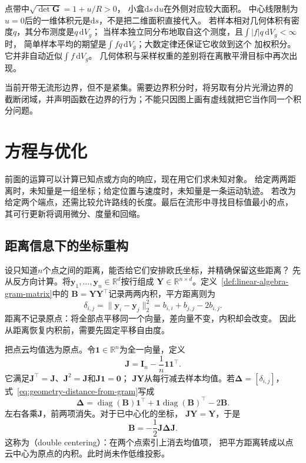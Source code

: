 点带中$\sqrt{\det\bm G}=1+u/R>0$，
小盒$\mathrm ds\,\mathrm du$在外侧对应较大面积。
中心线限制为$u=0$后的一维体积元是$\mathrm ds$，不是把二维面积直接代入。
若样本相对几何体积有密度$q$，其分布测度是$q\,\mathrm dV_g$；
当样本独立同分布地取自这个测度，且$\int|f|q\,\mathrm dV_g<\infty$时，
简单样本平均的期望是$\int fq\,\mathrm dV_g$；大数定律还保证它收敛到这个
加权积分。它并非自动近似$\int f\,\mathrm dV_g$。
几何体积与采样权重的差别将在离散平滑目标中再次出现。

当前开带无流形边界，但不是紧集。需要边界积分时，将另取有分片光滑边界的
截断闭域，并声明函数在边界的行为；不能只因图上画有虚线就把它当作同一个积分问题。

\section{方程与优化}
\label{sec:geometry-equations-optimization}

前面的运算可以计算已知点或方向的响应，现在用它们求未知对象。
给定两两距离时，未知量是一组坐标；给定位置与速度时，未知量是一条运动轨迹。
若改为给定两个端点，还需比较允许路线的长度。最后在流形中寻找目标值最小的点，
其可行更新将调用微分、度量和回缩。

\subsection{距离信息下的坐标重构}
\label{sec:geometry-distance-coordinate-embedding}

设只知道$n$个点之间的距离，能否给它们安排欧氏坐标，并精确保留这些距离？
先从反方向计算。将$\bm y_1,\ldots,\bm y_n\in\mathbb R^d$按行组成
$\bm Y\in\mathbb R^{n\times d}$。定义~\ref{def:linear-algebra-gram-matrix}中的
$\bm B=\bm Y\bm Y^\top$记录两两内积，平方距离则为
\begin{equation}
  \delta_{i,j}=\lVert\bm y_i-\bm y_j\rVert_2^2
  =b_{i,i}+b_{j,j}-2b_{i,j}.
  \label{eq:geometry-distance-from-gram}
\end{equation}
距离不记录原点：将全部点平移同一个向量，差向量不变，内积却会改变。
因此从距离恢复内积前，需要先固定平移自由度。

把点云均值选为原点。令$\bm1\in\mathbb R^n$为全一向量，定义
\begin{equation}
  \bm J=\bm I_n-\frac1n\bm1\bm1^\top.
  \label{eq:geometry-centering-matrix}
\end{equation}
它满足$\bm J^\top=\bm J$、$\bm J^2=\bm J$和$\bm J\bm1=\bm0$；
$\bm J\bm Y$从每行减去样本均值。若$\bm\Delta=[\delta_{i,j}]$，
式~\eqref{eq:geometry-distance-from-gram}写成
\[
  \bm\Delta=\operatorname{diag}(\bm B)\bm1^\top
  +\bm1\operatorname{diag}(\bm B)^\top-2\bm B.
\]
左右各乘$\bm J$，前两项消失。对于已中心化的坐标，
$\bm J\bm Y=\bm Y$，于是
\begin{equation}
  \bm B=-\frac12\bm J\bm\Delta\bm J.
  \label{eq:geometry-double-centering}
\end{equation}
这称为（double centering）：在两个点索引上消去均值项，
把平方距离转成以点云中心为原点的内积。此时尚未作低维投影。


